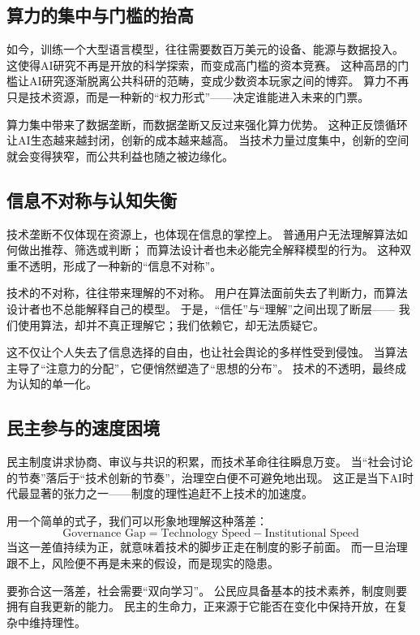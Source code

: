 \subsection{算力的集中与门槛的抬高}

如今，训练一个大型语言模型，往往需要数百万美元的设备、能源与数据投入。
这使得AI研究不再是开放的科学探索，而变成高门槛的资本竞赛。
这种高昂的门槛让AI研究逐渐脱离公共科研的范畴，变成少数资本玩家之间的博弈。
算力不再只是技术资源，而是一种新的“权力形式”——决定谁能进入未来的门票。

算力集中带来了数据垄断，而数据垄断又反过来强化算力优势。
这种正反馈循环让AI生态越来越封闭，创新的成本越来越高。
当技术力量过度集中，创新的空间就会变得狭窄，而公共利益也随之被边缘化。

\subsection{信息不对称与认知失衡}

技术垄断不仅体现在资源上，也体现在信息的掌控上。
普通用户无法理解算法如何做出推荐、筛选或判断；
而算法设计者也未必能完全解释模型的行为。
这种双重不透明，形成了一种新的“信息不对称”。

技术的不对称，往往带来理解的不对称。
用户在算法面前失去了判断力，而算法设计者也不总能解释自己的模型。
于是，“信任”与“理解”之间出现了断层——
我们使用算法，却并不真正理解它；我们依赖它，却无法质疑它。

这不仅让个人失去了信息选择的自由，也让社会舆论的多样性受到侵蚀。
当算法主导了“注意力的分配”，它便悄然塑造了“思想的分布”。
技术的不透明，最终成为认知的单一化。

\subsection{民主参与的速度困境}

民主制度讲求协商、审议与共识的积累，而技术革命往往瞬息万变。
当“社会讨论的节奏”落后于“技术创新的节奏”，治理空白便不可避免地出现。
这正是当下AI时代最显著的张力之一——制度的理性追赶不上技术的加速度。

用一个简单的式子，我们可以形象地理解这种落差：
\begin{equation}
\text{Governance Gap} = \text{Technology Speed} - \text{Institutional Speed}
\end{equation}
当这一差值持续为正，就意味着技术的脚步正走在制度的影子前面。
而一旦治理跟不上，风险便不再是未来的假设，而是现实的隐患。

要弥合这一落差，社会需要“双向学习”。
公民应具备基本的技术素养，制度则要拥有自我更新的能力。
民主的生命力，正来源于它能否在变化中保持开放，在复杂中维持理性。

